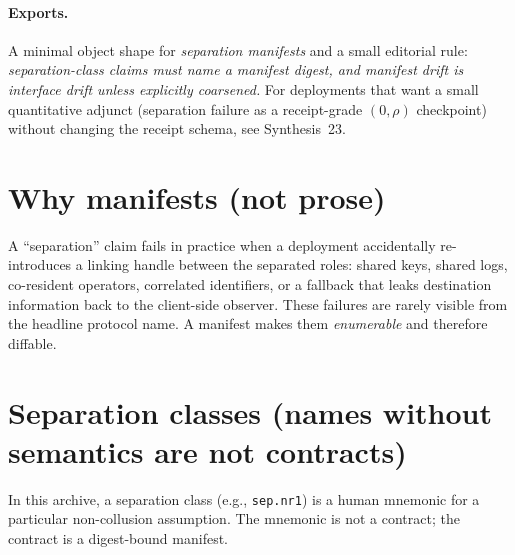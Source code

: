 \documentclass[11pt]{article}
\begin{document}
\paragraph{Exports.}
A minimal object shape for \emph{separation manifests} and a small editorial rule: \emph{separation-class claims must name a manifest digest, and manifest drift is interface drift unless explicitly coarsened.}
For deployments that want a small quantitative adjunct (separation failure as a receipt-grade $(0,\rho)$ checkpoint) without changing the receipt schema, see Synthesis~23.\cite{series:probsep}

\section{Why manifests (not prose)}
A ``separation'' claim fails in practice when a deployment accidentally re-introduces a linking handle between the separated roles:
shared keys, shared logs, co-resident operators, correlated identifiers, or a fallback that leaks destination information back to the client-side observer.
These failures are rarely visible from the headline protocol name.
A manifest makes them \emph{enumerable} and therefore diffable.

\section{Separation classes (names without semantics are not contracts)}
In this archive, a separation class (e.g., \texttt{sep.nr1}) is a human mnemonic for a particular non-collusion assumption.
The mnemonic is not a contract; the contract is a digest-bound manifest.
\end{document}
